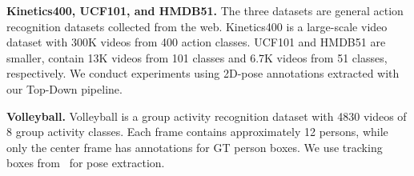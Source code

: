 \noindent
\textbf{Kinetics400, UCF101, and HMDB51. } 
The three datasets are general action recognition datasets collected from the web.
Kinetics400 is a large-scale video dataset with 300K videos from 400 action classes.
UCF101 and HMDB51 are smaller, contain 13K videos from 101 classes and 6.7K videos from 51 classes, respectively.
We conduct experiments using 2D-pose annotations extracted with our Top-Down pipeline. 

\noindent
\textbf{Volleyball. }
Volleyball is a group activity recognition dataset with 4830 videos of 8 group activity classes.
Each frame contains approximately 12 persons, while only the center frame has annotations for GT person boxes.
We use tracking boxes from~\cite{SendoMVA2019Heatmapping} for pose extraction.

\begin{table*}[t]
	\vspace{2mm}
	\begin{minipage}{.58\textwidth}
		\captionsetup{font=small}
		\centering
		\label{tab-gcnvscnn}
		\vspace{-2mm}
		\vspace{-2mm}
		\centering

\end{minipage}
\end{table*}
